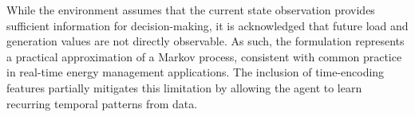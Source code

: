 While the environment assumes that the current state observation provides sufficient information for decision-making, it is acknowledged that future load and generation values are not directly observable. As such, the formulation represents a practical approximation of a Markov process, consistent with common practice in real-time energy management applications. The inclusion of time-encoding features partially mitigates this limitation by allowing the agent to learn recurring temporal patterns from data.
